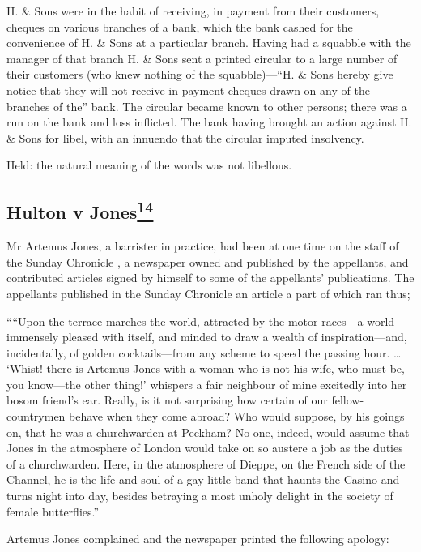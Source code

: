 \documentclass[]{article}
\begin{document}
H. \& Sons were in the habit of receiving, in payment from their
customers, cheques on various branches of a bank, which the bank cashed
for the convenience of H. \& Sons at a particular branch. Having had a
squabble with the manager of that branch H. \& Sons sent a printed
circular to a large number of their customers (who knew nothing of the
squabble)---``H. \& Sons hereby give notice that they will not receive
in payment cheques drawn on any of the branches of the'' bank. The
circular became known to other persons; there was a run on the bank and
loss inflicted. The bank having brought an action against H. \& Sons for
libel, with an innuendo that the circular imputed insolvency.

Held: the natural meaning of the words was not libellous.

\subsection{\texorpdfstring{{{Hulton v
Jones\hyperref[sdfootnote14sym]{\textsuperscript{14}}}}}{Hulton v Jones14}}

Mr Artemus Jones, a barrister in practice, had been at one time on the
staff of the Sunday Chronicle , a newspaper owned and published by the
appellants, and contributed articles signed by himself to some of the
appellants' publications. The appellants published in the Sunday
Chronicle an article a part of which ran thus;

````Upon the terrace marches the world, attracted by the motor races---a
world immensely pleased with itself, and minded to draw a wealth of
inspiration---and, incidentally, of golden cocktails---from any scheme
to speed the passing hour. \ldots{} `Whist! there is Artemus Jones with
a woman who is not his wife, who must be, you know---the other thing!'
whispers a fair neighbour of mine excitedly into her bosom friend's ear.
Really, is it not surprising how certain of our fellow-countrymen behave
when they come abroad? Who would suppose, by his goings on, that he was
a churchwarden at Peckham? No one, indeed, would assume that Jones in
the atmosphere of London would take on so austere a job as the duties of
a churchwarden. Here, in the atmosphere of Dieppe, on the French side of
the Channel, he is the life and soul of a gay little band that haunts
the Casino and turns night into day, besides betraying a most unholy
delight in the society of female butterflies.''

Artemus Jones complained and the newspaper printed the following
apology:
\end{document}
